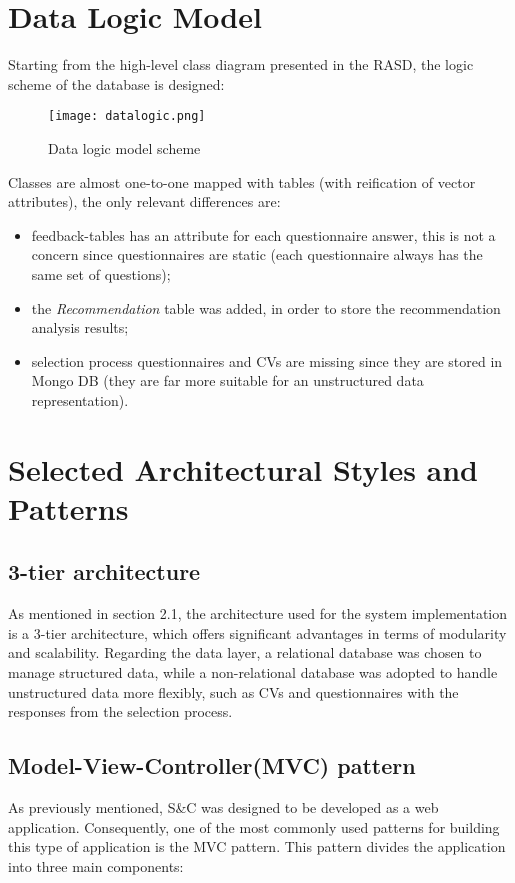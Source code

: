 	\section{Data Logic Model}
		Starting from the high-level class diagram presented in the RASD, the logic scheme of the database is designed:
		\begin{figure}[H]
			\centering
			\texttt{[image: datalogic.png]}
			\caption{Data logic model scheme}
		\end{figure}
		Classes are almost one-to-one mapped with tables (with reification of vector attributes), the only relevant differences are:
		\begin{itemize}
			\item feedback-tables has an attribute for each questionnaire answer, this is not a concern since questionnaires are static (each questionnaire always has the same set of questions);
			\item the \emph{Recommendation} table was added, in order to store the recommendation analysis results;
			\item selection process questionnaires and CVs are missing since they are stored in Mongo DB (they are far more suitable for an unstructured data representation).
		\end{itemize}
	\section{Selected Architectural Styles and Patterns}
	
		\subsection{3-tier architecture}
			As mentioned in section 2.1, the architecture used for the system implementation is a 3-tier architecture, which offers significant advantages in terms of modularity and scalability. Regarding the data layer, a relational database was chosen to manage structured data, while a non-relational database was adopted to handle unstructured data more flexibly, such as CVs and questionnaires with the responses from the selection process.
			
			
		\subsection{Model-View-Controller(MVC) pattern}
			As previously mentioned, S\&C was designed to be developed as a web application. Consequently, one of the most commonly used patterns for building this type of application is the MVC pattern. This pattern divides the application into three main components:
			
